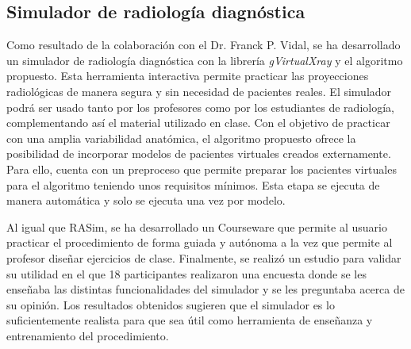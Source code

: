 

\subsection{Simulador de radiología diagnóstica}
Como resultado de la colaboración con el Dr. Franck P. Vidal, se ha desarrollado un simulador de radiología diagnóstica con la librería \emph{gVirtualXray} \cite{sujar:hal} y el algoritmo propuesto. Esta herramienta interactiva permite practicar las proyecciones radiológicas de manera segura y sin necesidad de pacientes reales.  El simulador podrá ser usado tanto por los profesores como por los estudiantes de radiología, complementando así el material utilizado en clase. Con el objetivo de practicar con una amplia variabilidad anatómica, el algoritmo propuesto ofrece la posibilidad de incorporar modelos de pacientes virtuales creados externamente. Para ello, cuenta con un preproceso que permite preparar los pacientes virtuales para el algoritmo teniendo unos requisitos mínimos. Esta etapa se ejecuta de manera automática y solo se ejecuta una vez por modelo.




Al igual que \ac{RASim}, se ha desarrollado un \ac{Courseware} que permite al usuario practicar el procedimiento de forma guiada y autónoma a la vez que permite al profesor diseñar ejercicios de clase. Finalmente, se realizó un estudio para validar su utilidad en el que 18 participantes realizaron una encuesta donde se les enseñaba las distintas funcionalidades del simulador y se les preguntaba acerca de su opinión. Los resultados obtenidos sugieren que el simulador es lo suficientemente realista para que sea útil como herramienta de enseñanza y entrenamiento del procedimiento.




